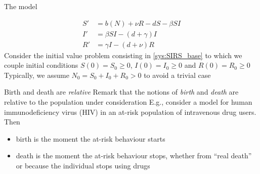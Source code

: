 \documentclass[aspectratio=43]{beamer}
\begin{document}
\begin{frame}{The model}
\begin{minipage}{0.25\textwidth}
  \def\skip{*-1.5}
\end{minipage}
\begin{minipage}{0.7\textwidth}
  \begin{subequations} \label{sys:SIRS_base}
  \begin{align}
    S' &= b(N)+\nu R-dS-\beta SI \label{sys:SIRS_base_dS} \\
    I' &= \beta SI-(d+\gamma) I \label{sys:SIRS_base_dI} \\
    R' &= \gamma I-(d+\nu)R \label{sys:SIRS_base_dR}
  \end{align}    
  \end{subequations}
  \vskip1cm
  Consider the initial value problem consisting in \eqref{sys:SIRS_base} to which we couple initial conditions $S(0)=S_0\geq 0$, $I(0)=I_0\geq 0$ and $R(0)=R_0\geq 0$
  \vskip1cm
  Typically, we assume $N_0=S_0+I_0+R_0>0$ to avoid a trivial case
  \end{minipage}
\end{frame}

\begin{frame}{Birth and death are \emph{relative}}
  Remark that the notions of \emph{birth} and \emph{death} are relative to the population under consideration
  \vfill
  E.g., consider a model for human immunodeficiency virus (HIV) in an at-risk population of intravenous drug users. Then
  \begin{itemize}
    \item birth is the moment the at-risk behaviour starts 
    \item death is the moment the at-risk behaviour stops,  whether from ``real death'' or because the individual stops using drugs
  \end{itemize}
\end{frame}
\end{document}
